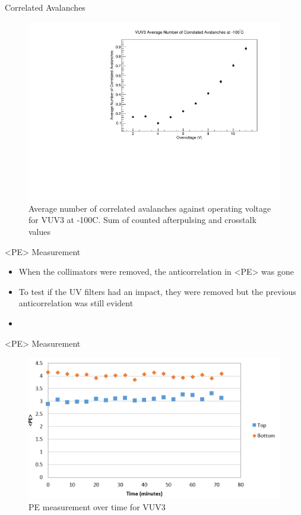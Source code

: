 \documentclass{beamer}
\begin{document}
\begin{frame}{Correlated Avalanches}
\begin{figure}
\centering
\includegraphics[height=0.5\textwidth]{VUV3_CA_vs_OV.pdf}
\caption{Average number of correlated avalanches against operating voltage for VUV3 at -100C. Sum of counted afterpulsing and crosstalk values}
\end{figure}
\end{frame}

\begin{frame}{<PE> Measurement}
\begin{itemize}
\item When the collimators were removed, the anticorrelation in <PE> was gone
\item To test if the UV filters had an impact, they were removed but the previous anticorrelation was still evident
\item 
\end{itemize}
\end{frame}

\begin{frame}{<PE> Measurement}
\begin{figure}
\centering
\includegraphics[height=0.5\textwidth]{PE.PNG}
\caption{PE measurement over time for VUV3}
\end{figure}
\end{frame}
\end{document}

